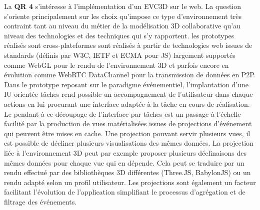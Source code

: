 La \textbf{QR 4} s'intéresse à l'implémentation d'un \gls{EVC3D} sur le web. La 
question s'oriente principalement sur les choix qu'impose ce type d'environnement 
très contraint tant au niveau du métier de la modélisation 3D collaborative 
qu'au niveau des technologies et des techniques qui s'y rapportent.
les prototypes réalisés sont cross-plateformes sont réalisés à partir de 
technologies web issues de standards (définis par \gls{W3C}, \gls{IETF} et 
\acrshort{ECMA} 
pour \gls{JS}) largement supportés comme WebGL pour le rendu de 
l'environnement 3D et parfois encore en évolution comme WebRTC DataChannel 
pour la transmission de données en \gls{P2P}. 
Dans le prototype reposant sur le paradigme événementiel, l'implantation d'une 
\gls{IU} orientée tâches rend possible un accompagnement de l'utilisateur dans 
chaque actions en lui procurant une interface adaptée à la tâche en cours de 
réalisation. Le pendant à ce découpage de l'interface par tâches est un passage à 
l'échelle facilité par la production de vues matérialisées issues de projections 
d'événement qui peuvent être mises en cache. Une projection pouvant servir 
plusieurs vues, il est possible de décliner plusieurs visualisations des mêmes 
données. La projection liée à l'environnement 3D peut par exemple proposer 
plusieurs déclinaisons des mêmes données pour chaque vue qui en dépende. Cela 
peut se traduire par un rendu effectué par des bibliothèques 3D différentes 
(Three.JS, BabylonJS) ou un rendu adapté selon un profil utilisateur. Les 
projections sont également un facteur facilitant l'évolution de l'application 
simplifiant le processus d'agrégation et de filtrage des événements.

